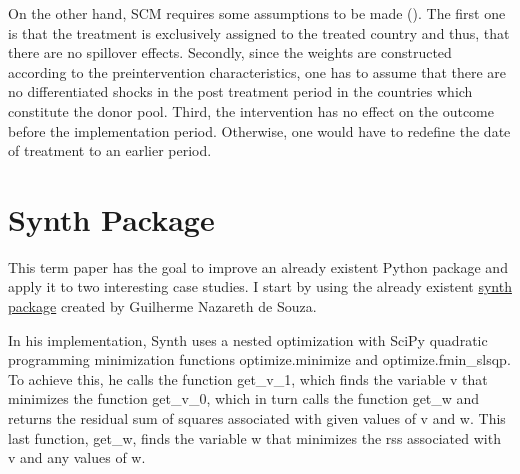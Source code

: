 \documentclass[11pt, a4paper, leqno]{article}
\begin{document}
On the other hand, SCM requires some assumptions to be made (\citet{Abadie2010}). The first one is that the treatment is exclusively assigned to the treated country and thus, that there are no spillover effects. Secondly, since the weights are constructed according to the preintervention characteristics, one has to assume that there are no differentiated shocks in the post treatment period in the countries which constitute the donor pool. Third, the intervention has no effect on the outcome before the implementation period. Otherwise, one would have to redefine the date of treatment to an earlier period. \\

\section{Synth Package} %
\label{synth}

This term paper has the goal to improve an already existent Python package and apply it to two interesting case studies. I start by using the already existent \href{https://github.com/gnazareths/synth}{synth package} created by Guilherme Nazareth de Souza. 

In his implementation, Synth uses a nested optimization with SciPy quadratic programming minimization functions optimize.minimize and optimize.fmin\_slsqp. To achieve this, he calls the function get\_v\_1, which finds the variable v that minimizes the function get\_v\_0, which in turn calls the function get\_w and returns the residual sum of squares associated with given values of v and w. This last function, get\_w, finds the variable w that minimizes the rss associated with v and any values of w.
\end{document}
